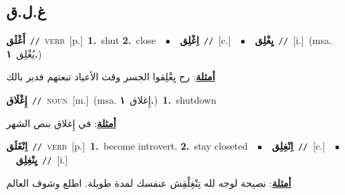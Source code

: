 \documentclass[10pt,a4paper,twoside]{article} %
\begin{document}
\begin{multicols}{2}
\vspace{-3mm}
\subsection*{\color{blue}\foreignlanguage{arabic}{غ.ل.ق}\color{blue}{}} 

{\setlength\topsep{0pt}\textbf{\foreignlanguage{arabic}{أَغْلَق}}\ {\color{gray}\texttt{//}\color{black}}\ \textsc{verb}\ [p.]\ \textbf{1.}~shut  \textbf{2.}~close\ \ $\bullet$\ \ \setlength\topsep{0pt}\textbf{\foreignlanguage{arabic}{اِغْلِق}}\ {\color{gray}\texttt{//}\color{black}}\ [c.]\ \ $\bullet$\ \ \setlength\topsep{0pt}\textbf{\foreignlanguage{arabic}{يِغْلِق}}\ {\color{gray}\texttt{//}\color{black}}\ [i.]\ \color{gray}(msa. \foreignlanguage{arabic}{يُغْلِق}~\foreignlanguage{arabic}{\textbf{١.}})\color{black}\  \begin{flushright}\color{gray}\foreignlanguage{arabic}{\textbf{\underline{\foreignlanguage{arabic}{أمثلة}}}: رح يِغْلِقوا الجسر وقت الأعياد تبعتهم فدير بالك}\end{flushright}\color{black}} \vspace{2mm}

{\setlength\topsep{0pt}\textbf{\foreignlanguage{arabic}{إِغْلَاق}}\ {\color{gray}\texttt{//}\color{black}}\ \textsc{noun}\ [m.]\ \color{gray}(msa. \foreignlanguage{arabic}{إِغلاق}~\foreignlanguage{arabic}{\textbf{١.}})\color{black}\ \textbf{1.}~shutdown\  \begin{flushright}\color{gray}\foreignlanguage{arabic}{\textbf{\underline{\foreignlanguage{arabic}{أمثلة}}}: في إِغلاق بنص الشهر}\end{flushright}\color{black}} \vspace{2mm}

{\setlength\topsep{0pt}\textbf{\foreignlanguage{arabic}{اِنْغَلَق}}\ {\color{gray}\texttt{//}\color{black}}\ \textsc{verb}\ [p.]\ \textbf{1.}~become introvert.  \textbf{2.}~stay closeted\ \ $\bullet$\ \ \setlength\topsep{0pt}\textbf{\foreignlanguage{arabic}{اِنْغِلِق}}\ {\color{gray}\texttt{//}\color{black}}\ [c.]\ \ $\bullet$\ \ \setlength\topsep{0pt}\textbf{\foreignlanguage{arabic}{يِنْغِلِق}}\ {\color{gray}\texttt{//}\color{black}}\ [i.]\  \begin{flushright}\color{gray}\foreignlanguage{arabic}{\textbf{\underline{\foreignlanguage{arabic}{أمثلة}}}: نصيحة لوجه لله تِنْغِلْقِش عنفسك لمدة طويلة. اطلع وشوف العالم}\end{flushright}\color{black}} \vspace{2mm}


\end{multicols}
\end{document}
